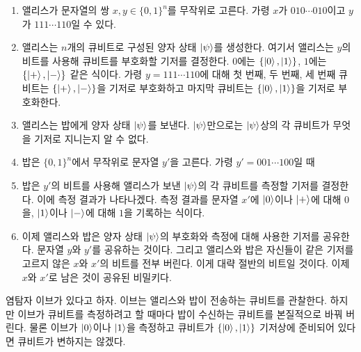 \documentclass[a4paper,chapter,atbegshi]{oblivoir}
\begin{document}
\begin{enumerate}[label=(\roman*)]
  \item 앨리스가 문자열의 쌍 $x,y\in\{0,1\}^n$를 무작위로 고른다. 가령 $x$가
    $010\cdots010$이고 $y$가 $111\cdots110$일 수 있다.
  \item 앨리스는 $n$개의 큐비트로 구성된 양자 상태 $\ket{\psi}$를 생성한다. 여기서
    앨리스는 $y$의 비트를 사용해 큐비트를 부호화할 기저를 결정한다. 
    $0$에는 $\{\ket0,\ket1\}$, $1$에는 $\{\ket+,\ket-\}$ 같은 식이다. 
    가령 $y=111\cdots110$에 대해 첫 번째, 두 번째, 세 번째 큐비트는 $\{\ket+,
    \ket-\}$을 기저로 부호화하고 마지막 큐비트는 $\{\ket0,\ket1\}$을 기저로 
    부호화한다.
  \item 앨리스는 밥에게 양자 상태 $\ket{\psi}$를 보낸다. $\ket{\psi}$만으로는
    $\ket{\psi}$상의 각 큐비트가 무엇을 기저로 지니는지 알 수 없다.
  \item 밥은 $\{0,1\}^n$에서 무작위로 문자열 $y'$을 고른다. 가령 $y'=001\cdots
    100$일 때
  \item 밥은 $y'$의 비트를 사용해 앨리스가 보낸 $\ket{\psi}$의 각 큐비트를 측정할
    기저를 결정한다. 이에 측정 결과가 나타나겠다. 측정 결과를 문자열 $x'$에
    $\ket0$이나 $\ket+$에 대해 $0$을, $\ket1$이나 $\ket-$에 대해 $1$을 기록하는
    식이다.
  \item 이제 앨리스와 밥은 양자 상태 $\ket{\psi}$의 부호화와 측정에 대해
    사용한 기저를 공유한다. 문자열 $y$와 $y'$를 공유하는 것이다. 그리고
    앨리스와 밥은 자신들이 같은 기저를 고르지 않은 $x$와 $x'$의 비트를
    전부 버린다. 이게 대략 절반의 비트일 것이다. 이제 $x$와 $x'$로
    남은 것이 공유된 비밀키다. 
\end{enumerate}
염탐자 이브가 있다고 하자. 이브는 앨리스와 밥이 전송하는 큐비트를 관찰한다.
하지만 이브가 큐비트를 측정하려고 할 때마다 밥이 수신하는 큐비트를
본질적으로 바꿔 버린다. 물론 이브가 $\ket0$이나 $\ket1$을 측정하고 큐비트가
$\{\ket0,\ket1\}$ 기저상에 준비되어 있다면 큐비트가 변하지는 않겠다. 
\end{document}
